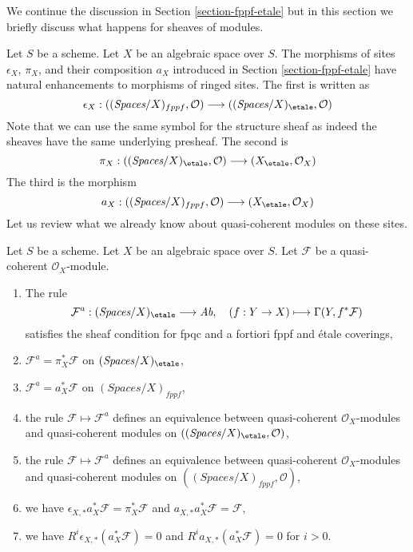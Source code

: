 \noindent
We continue the discussion in Section \ref{section-fppf-etale} but in this
section we briefly discuss what happens for sheaves of modules.

\medskip\noindent
Let $S$ be a scheme. Let $X$ be an algebraic space over $S$.
The morphisms of sites $\epsilon_X$, $\pi_X$, and
their composition $a_X$ introduced in Section \ref{section-fppf-etale}
have natural enhancements to morphisms of ringed sites. The first
is written as
$$
\epsilon_X :
((\textit{Spaces}/X)_{fppf}, \mathcal{O})
\longrightarrow
((\textit{Spaces}/X)_\etale, \mathcal{O})
$$
Note that we can use the same symbol for the structure sheaf as indeed
the sheaves have the same underlying presheaf. The second is
$$
\pi_X :
((\textit{Spaces}/X)_\etale, \mathcal{O})
\longrightarrow
(X_\etale, \mathcal{O}_X)
$$
The third is the morphism
$$
a_X :
((\textit{Spaces}/X)_{fppf}, \mathcal{O})
\longrightarrow
(X_\etale, \mathcal{O}_X)
$$
Let us review what we already know about quasi-coherent
modules on these sites.

\begin{lemma}
\label{lemma-review-quasi-coherent}
Let $S$ be a scheme. Let $X$ be an algebraic space over $S$.
Let $\mathcal{F}$ be a quasi-coherent $\mathcal{O}_X$-module.
\begin{enumerate}
\item The rule
$$
\mathcal{F}^a : (\textit{Spaces}/X)_\etale \longrightarrow \textit{Ab},\quad
(f : Y \to X) \longmapsto \Gamma(Y, f^*\mathcal{F})
$$
satisfies the sheaf condition for fpqc and a fortiori
fppf and \'etale coverings,
\item $\mathcal{F}^a = \pi_X^*\mathcal{F}$ on $(\textit{Spaces}/X)_\etale$,
\item $\mathcal{F}^a = a_X^*\mathcal{F}$ on $(\textit{Spaces}/X)_{fppf}$,
\item the rule $\mathcal{F} \mapsto \mathcal{F}^a$ defines
an equivalence between quasi-coherent $\mathcal{O}_X$-modules
and quasi-coherent modules on
$((\textit{Spaces}/X)_\etale, \mathcal{O})$,
\item the rule $\mathcal{F} \mapsto \mathcal{F}^a$ defines
an equivalence between quasi-coherent $\mathcal{O}_X$-modules
and quasi-coherent modules on
$((\textit{Spaces}/X)_{fppf}, \mathcal{O})$,
\item we have $\epsilon_{X, *}a_X^*\mathcal{F} = \pi_X^*\mathcal{F}$
and $a_{X, *}a_X^*\mathcal{F} = \mathcal{F}$,
\item we have $R^i\epsilon_{X, *}(a_X^*\mathcal{F}) = 0$
and $R^ia_{X, *}(a_X^*\mathcal{F}) = 0$ for $i > 0$.
\end{enumerate}
\end{lemma}

